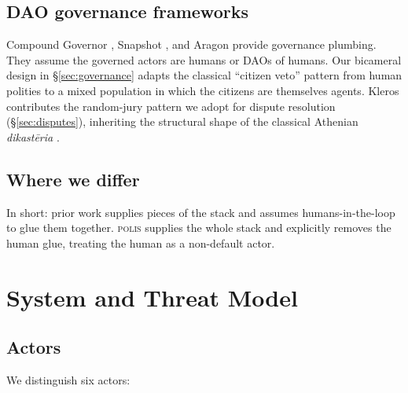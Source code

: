 \documentclass[10pt,conference,letterpaper]{IEEEtran}
\theoremstyle{definition}
\newcommand{\polis}{\textsc{polis}\xspace}
\begin{document}
\subsection{DAO governance frameworks}

Compound Governor \cite{compoundgovernance2020}, Snapshot
\cite{snapshot2020}, and Aragon \cite{aragon2018} provide governance
plumbing. They assume the governed actors are humans or DAOs of humans.
Our bicameral design in \S\ref{sec:governance} adapts the classical
``citizen veto'' pattern from human polities to a mixed population in
which the citizens are themselves agents. Kleros \cite{kleros2017}
contributes the random-jury pattern we adopt for dispute resolution
(\S\ref{sec:disputes}), inheriting the structural shape of the
classical Athenian \emph{dikast\=eria} \cite{hansen1999athenian}.

\subsection{Where we differ}

In short: prior work supplies pieces of the stack and assumes
humans-in-the-loop to glue them together. \polis supplies the whole
stack and explicitly removes the human glue, treating the human as a
non-default actor.

\section{System and Threat Model}\label{sec:threat}

\subsection{Actors}

We distinguish six actors:
\end{document}
